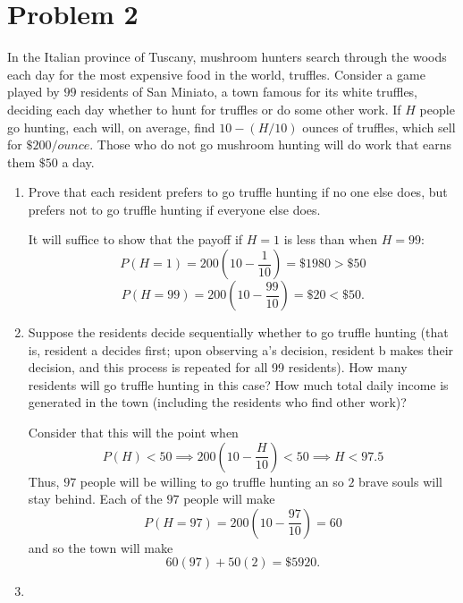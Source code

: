 \documentclass[11pt]{article}
\begin{document}
\section*{Problem 2}
\begin{problem}
    In the Italian province of Tuscany, mushroom hunters search through the woods each day for the most
expensive food in the world, truffles. Consider a game played by $99$ residents of San Miniato, a town
famous for its white truffles, deciding each day whether to hunt for truffles or do some other work. If $H$
people go hunting, each will, on average, find $10 - (H/10)$ ounces of truffles, which sell for $\$200/ounce.$
Those who do not go mushroom hunting will do work that earns them $\$50$ a day.
\end{problem}
\begin{enumerate}
    \item 
    \begin{problem}
        Prove that each resident prefers to go truffle hunting if no one else does, but prefers not to go truffle
hunting if everyone else does.
    \end{problem}
    \begin{solution}
        It will suffice to show that the payoff if $H=1$ is less than when $H = 99:$
        \[P(H=1) = 200(10 - \frac{1}{10}) = \$1980> \$50\]
        \[P(H=99) = 200(10 - \frac{99}{10}) = \$20< \$50.\] 
    \end{solution}
    \item 
    \begin{problem}
        Suppose the residents decide sequentially whether to go truffle hunting (that is, resident a decides
first; upon observing a’s decision, resident b makes their decision, and this process is repeated for all
99 residents). How many residents will go truffle hunting in this case? How much total daily income
is generated in the town (including the residents who find other work)?
    \end{problem}
    \begin{solution}
        Consider that this will the point when 
        \[P(H) < 50 \implies 200(10-\frac{H}{10})< 50 \implies H < 97.5\] Thus, $97$ people will be willing to go truffle hunting an so $2$ brave souls will stay behind. Each of the $97$ people will make
        \[P(H = 97) = 200(10 - \frac{97}{10}) = 60\] and so the town will make 
        \[60(97) + 50(2) = \$5920.\]
    \end{solution}
    \item 
    \begin{problem}

\end{problem}
\end{enumerate}
\end{document}
